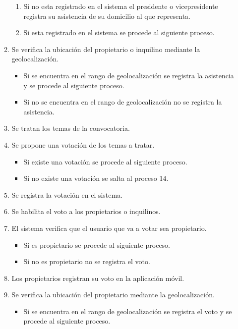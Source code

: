 \begin{itemize}
\begin{enumerate}
        \begin{enumerate}
            \item Si no esta registrado en el sistema el presidente o vicepresidente registra su asistencia de su domicilio al que representa.
            \item Si esta registrado en el sistema se procede al siguiente proceso.
        \end{enumerate}
        \item Se verifica la ubicación del propietario o inquilino mediante la geolocalización.
        \begin{itemize}
            \item Si se encuentra en el rango de geolocalización se registra la asistencia y se procede al siguiente proceso.
            \item Si no se encuentra en el rango de geolocalización no se registra la asistencia.
        \end{itemize}
        \item Se tratan los temas de la convocatoria.
        \item Se propone una votación de los temas a tratar.
        \begin{itemize}
            \item Si existe una votación se procede al siguiente proceso.
            \item Si no existe una votación se salta al proceso 14.
        \end{itemize}
        \item Se registra la votación en el sistema.
        \item Se habilita el voto a los propietarios o inquilinos.
        \item El sistema verifica que el usuario que va a votar sea propietario.
        \begin{itemize}
            \item Si es propietario se procede al siguiente proceso.
            \item Si no es propietario no se registra el voto.
        \end{itemize}
        \item Los propietarios registran su voto en la aplicación móvil.
        \item Se verifica la ubicación del propietario mediante la geolocalización.
        \begin{itemize}
            \item Si se encuentra en el rango de geolocalización se registra el voto y se procede al siguiente proceso.

\end{itemize}
\end{enumerate}
\end{itemize}
